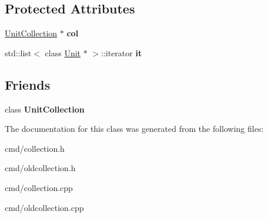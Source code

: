 \subsection*{Protected Attributes}
\begin{DoxyCompactItemize}
\item 
\hyperlink{classUnitCollection}{Unit\+Collection} $\ast$ {\bfseries col}\hypertarget{classUnitCollection_1_1UnitIterator_aba469ea92ec88cfd24b7b69ac7b5f834}{}\label{classUnitCollection_1_1UnitIterator_aba469ea92ec88cfd24b7b69ac7b5f834}

\item 
std\+::list$<$ class \hyperlink{classUnit}{Unit} $\ast$ $>$\+::iterator {\bfseries it}\hypertarget{classUnitCollection_1_1UnitIterator_a26c5b4906336feb08549ba70a988e76f}{}\label{classUnitCollection_1_1UnitIterator_a26c5b4906336feb08549ba70a988e76f}

\end{DoxyCompactItemize}
\subsection*{Friends}
\begin{DoxyCompactItemize}
\item 
class {\bfseries Unit\+Collection}\hypertarget{classUnitCollection_1_1UnitIterator_a6279c32de851a8d1507adb240445913e}{}\label{classUnitCollection_1_1UnitIterator_a6279c32de851a8d1507adb240445913e}

\end{DoxyCompactItemize}


The documentation for this class was generated from the following files\+:\begin{DoxyCompactItemize}
\item 
cmd/collection.\+h\item 
cmd/oldcollection.\+h\item 
cmd/collection.\+cpp\item 
cmd/oldcollection.\+cpp\end{DoxyCompactItemize}
